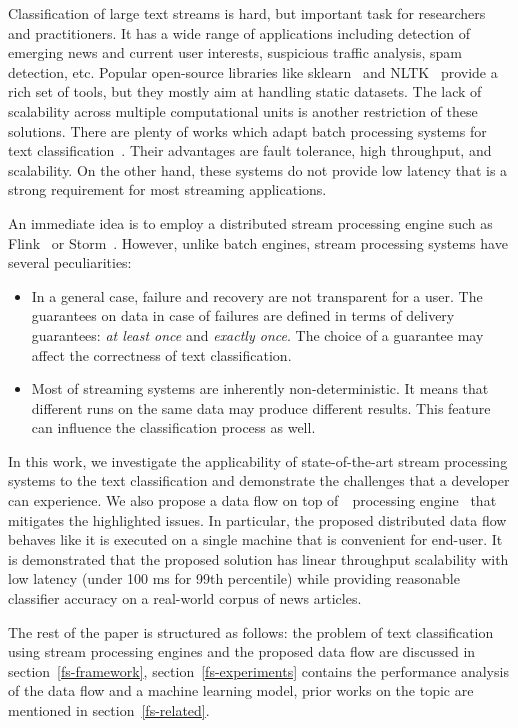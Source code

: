 \label {fs-short-intro}

Classification of large text streams is hard, but important task for researchers and practitioners. It has a wide range of applications including detection of emerging news and current user interests, suspicious traffic analysis, spam detection, etc. Popular open-source libraries like sklearn~\cite{sklearn_api} and NLTK~\cite{bird2009natural} provide a rich set of tools, but they mostly aim at handling static datasets. The lack of scalability across multiple computational units is another restriction of these solutions. There are plenty of works which adapt batch processing systems for text classification~\cite{semberecki2016distributed, svyatkovskiy2016large, baltas2016apache, Nodarakis2016LargeSS}. Their advantages are fault tolerance, high throughput, and scalability. On the other hand, these systems do not provide low latency that is a strong requirement for most streaming applications.

An immediate idea is to employ a distributed stream processing engine such as Flink~\cite{Carbone:2017:SMA:3137765.3137777} or Storm~\cite{apache:storm}. However, unlike batch engines, stream processing systems have several peculiarities: 

\begin{itemize}
    \item In a general case, failure and recovery are not transparent for a user. The guarantees on data in case of failures are defined in terms of delivery guarantees: {\em at least once} and {\em exactly once}. The choice of a guarantee may affect the correctness of text classification.
    \item Most of streaming systems are inherently non-deterministic. It means that different runs on the same data may produce different results. This feature can influence the classification process as well.
\end{itemize}

In this work, we investigate the applicability of state-of-the-art stream processing systems to the text classification and demonstrate the challenges that a developer can experience. We also propose a data flow on top of~\FlameStream\ processing engine~\cite{we2018beyondmr, we2018adbis} that mitigates the highlighted issues. In particular, the proposed distributed data flow behaves like it is executed on a single machine that is convenient for end-user. It is demonstrated that the proposed solution has linear throughput scalability with low latency (under 100 ms for 99th percentile) while providing reasonable classifier accuracy on a real-world corpus of news articles.

The rest of the paper is structured as follows: the problem of text classification using stream processing engines and the proposed data flow are discussed in section~\ref{fs-framework}, section~\ref{fs-experiments} contains the performance analysis of the data flow and a machine learning model, prior works on the topic are mentioned in section~\ref{fs-related}.
